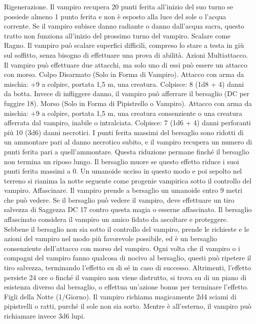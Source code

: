\begin{multicols}{2}
Rigenerazione. Il vampiro recupera 20 punti ferita all’inizio del
suo turno se possiede almeno 1 punto ferita e non è esposto alla
luce del sole o l’acqua corrente. Se il vampiro subisce danno
radiante o danno dall’acqua sacra, questo tratto non funziona
all’inizio del prossimo turno del vampiro.
Scalare come Ragno. Il vampiro può scalare superfici difficili,
compreso lo stare a testa in giù sul soffitto, senza bisogno di
effettuare una prova di abilità.
Azioni
Multiattacco. Il vampiro può effettuare due attacchi, ma solo uno
di essi può essere un attacco con morso.
Colpo Disarmato (Solo in Forma di Vampiro). Attacco con
arma da mischia: +9 a colpire, portata 1,5 m, una creatura.
Colpisce: 8 (1d8 + 4) danni da botta. Invece di infliggere
danno, il vampiro può afferrare il bersaglio (DC per fuggire 18).
Morso (Solo in Forma di Pipistrello o Vampiro). Attacco con
arma da mischia: +9 a colpire, portata 1,5 m, una creatura
consenziente o una creatura afferrata dal vampiro, inabile o
intralciata.
Colpisce: 7 (1d6 + 4) danni perforanti più 10 (3d6) danni
necrotici. I punti ferita massimi del bersaglio sono ridotti di un
ammontare pari al danno necrotico subito, e il vampiro recupera
un numero di punti ferita pari a quell’ammontare. Questa
riduzione permane finché il bersaglio non termina un riposo
lungo. Il bersaglio muore se questo effetto riduce i suoi punti
ferita massimi a 0. Un umanoide ucciso in questo modo e poi
sepolto nel terreno si rianima la notte seguente come progenie
vampirica sotto il controllo del vampiro.
Affascinare. Il vampiro prende a bersaglio un umanoide entro 9
metri che può vedere. Se il bersaglio può vedere il vampiro, deve
effettuare un tiro salvezza di Saggezza DC 17 contro questa
magia o esserne affascinato. Il bersaglio affascinato considera il
vampiro un amico fidato da ascoltare e proteggere. Sebbene il
bersaglio non sia sotto il controllo del vampiro, prende le
richieste e le azioni del vampiro nel modo più favorevole
possibile, ed è un bersaglio consenziente dell’attacco con morso
del vampiro.
Ogni volta che il vampiro o i compagni del vampiro fanno
qualcosa di nocivo al bersaglio, questi può ripetere il tiro
salvezza, terminando l’effetto su di sé in caso di successo.
Altrimenti, l’effetto persiste 24 ore o finché il vampiro non viene
distrutto, si trova su di un piano di esistenza diverso dal
bersaglio, o effettua un’azione bonus per terminare l’effetto.
Figli della Notte (1/Giorno). Il vampiro richiama magicamente
2d4 sciami di pipistrelli o ratti, purché il sole non sia sorto.
Mentre è all’esterno, il vampiro può richiamare invece 3d6 lupi.

\end{multicols}
